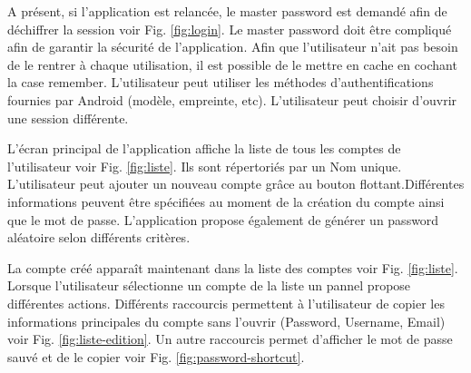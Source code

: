 A présent, si l'application est relancée, le master password est demandé afin de déchiffrer la session voir Fig. \ref{fig:login}. Le master password doit être compliqué afin de garantir la sécurité de l'application. Afin que l'utilisateur n'ait pas besoin de le rentrer à chaque utilisation, il est possible de le mettre en cache en cochant la case remember. L'utilisateur peut utiliser les méthodes d'authentifications fournies par Android (modèle, empreinte, etc). L'utilisateur peut choisir d'ouvrir une session différente. 

\begin{center}
	\begin{minipage}{.3\textwidth}
	\end{minipage}
	\begin{minipage}{.3\textwidth}
	\end{minipage}        
\end{center}

L'écran principal de l'application affiche la liste de tous les comptes de l'utilisateur voir Fig. \ref{fig:liste}. Ils sont répertoriés par un Nom unique. L'utilisateur peut ajouter un nouveau compte grâce au bouton flottant.Différentes informations peuvent être spécifiées au moment de la création du compte ainsi que le mot de passe. L'application \easypass{} propose également de générer un password aléatoire selon différents critères. 

\begin{center}
	\begin{minipage}{.3\textwidth}
	\end{minipage}
	\begin{minipage}{.3\textwidth}
	\end{minipage}
	\begin{minipage}{.3\textwidth}
	\end{minipage}        
\end{center}

La compte créé apparaît maintenant dans la liste des comptes voir Fig. \ref{fig:liste}. Lorsque l'utilisateur sélectionne un compte de la liste un pannel propose différentes actions. Différents raccourcis permettent à l'utilisateur de copier les informations principales du compte sans l'ouvrir (Password, Username, Email) voir Fig. \ref{fig:liste-edition}. Un autre raccourcis permet d'afficher le mot de passe sauvé et de le copier voir Fig. \ref{fig:password-shortcut}. 

